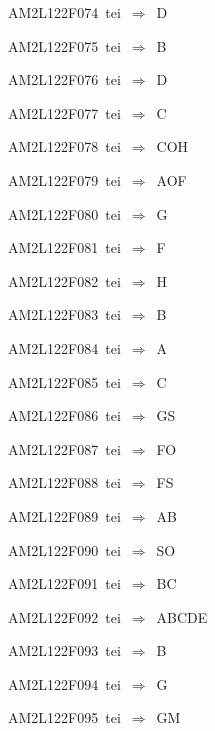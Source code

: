 {\sixrm AM2L122F074\ {\sixit tei}\ }$\Rightarrow$\ D\par\smallskip
{\sixrm AM2L122F075\ {\sixit tei}\ }$\Rightarrow$\ B\par\smallskip
{\sixrm AM2L122F076\ {\sixit tei}\ }$\Rightarrow$\ D\par\smallskip
{\sixrm AM2L122F077\ {\sixit tei}\ }$\Rightarrow$\ C\par\smallskip
{\sixrm AM2L122F078\ {\sixit tei}\ }$\Rightarrow$\ COH\par\smallskip
{\sixrm AM2L122F079\ {\sixit tei}\ }$\Rightarrow$\ AOF\par\smallskip
{\sixrm AM2L122F080\ {\sixit tei}\ }$\Rightarrow$\ G\par\smallskip
{\sixrm AM2L122F081\ {\sixit tei}\ }$\Rightarrow$\ F\par\smallskip
{\sixrm AM2L122F082\ {\sixit tei}\ }$\Rightarrow$\ H\par\smallskip
{\sixrm AM2L122F083\ {\sixit tei}\ }$\Rightarrow$\ B\par\smallskip
{\sixrm AM2L122F084\ {\sixit tei}\ }$\Rightarrow$\ A\par\smallskip
{\sixrm AM2L122F085\ {\sixit tei}\ }$\Rightarrow$\ C\par\smallskip
{\sixrm AM2L122F086\ {\sixit tei}\ }$\Rightarrow$\ GS\par\smallskip
{\sixrm AM2L122F087\ {\sixit tei}\ }$\Rightarrow$\ FO\par\smallskip
{\sixrm AM2L122F088\ {\sixit tei}\ }$\Rightarrow$\ FS\par\smallskip
{\sixrm AM2L122F089\ {\sixit tei}\ }$\Rightarrow$\ AB\par\smallskip
{\sixrm AM2L122F090\ {\sixit tei}\ }$\Rightarrow$\ SO\par\smallskip
{\sixrm AM2L122F091\ {\sixit tei}\ }$\Rightarrow$\ BC\par\smallskip
{\sixrm AM2L122F092\ {\sixit tei}\ }$\Rightarrow$\ ABCDE\par\smallskip
{\sixrm AM2L122F093\ {\sixit tei}\ }$\Rightarrow$\ B\par\smallskip
{\sixrm AM2L122F094\ {\sixit tei}\ }$\Rightarrow$\ G\par\smallskip
{\sixrm AM2L122F095\ {\sixit tei}\ }$\Rightarrow$\ GM\par\smallskip

